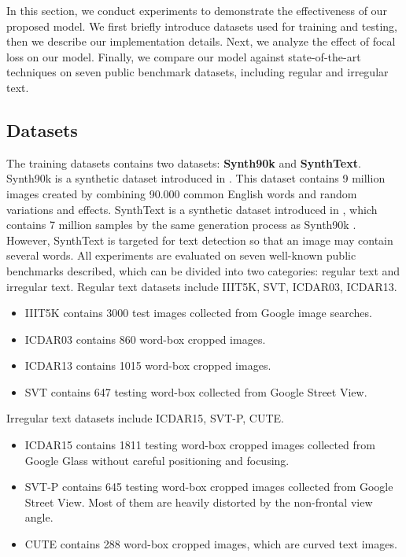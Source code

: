 In this section, we conduct experiments to demonstrate the effectiveness of our proposed model. We first briefly introduce datasets used for training and testing, then we describe our implementation details. Next, we analyze the effect of focal loss on our model. Finally, we compare our model against state-of-the-art techniques on seven public benchmark datasets, including regular and irregular text. 
\subsection{Datasets} \label{sec:datasets}
The training datasets contains two datasets: \textbf{Synth90k} and \textbf{SynthText}. Synth90k is a synthetic dataset introduced in \cite{jaderberg2014synthetic}. This dataset contains 9 million images created by combining  90.000 common English words and random variations and effects. SynthText is a synthetic dataset introduced in \cite{gupta2016synthetic}, which contains 7 million samples by the same generation process as Synth90k \cite{jaderberg2014synthetic}. 
However, SynthText is targeted for text detection so that an image may contain several words. 
All experiments are evaluated on seven well-known public benchmarks described, which can be divided into two categories: regular text and irregular text. 
Regular text datasets include IIIT5K, SVT, ICDAR03, ICDAR13.
\begin{itemize}
    \item IIIT5K \cite{mishra2012top} contains 3000 test images collected from Google image searches. 
    \item ICDAR03 \cite{lucas2005icdar} contains 860 word-box cropped images.
    \item ICDAR13 \cite{karatzas2013icdar} contains 1015 word-box cropped images.
    \item SVT contains 647 testing word-box collected from Google Street View. 
\end{itemize}
{Irregular text} datasets include ICDAR15, SVT-P, CUTE.
\begin{itemize}
    \item ICDAR15 \cite{karatzas2015icdar} contains 1811 testing word-box cropped images collected from Google Glass without careful positioning and focusing. 
    \item SVT-P \cite{quy2013recognizing} contains 645 testing word-box cropped images collected from Google Street View. Most of them are heavily distorted by the non-frontal view angle. 
    \item CUTE \cite{risnumawan2014robust} contains 288 word-box cropped images, which are curved text images.
\end{itemize}
